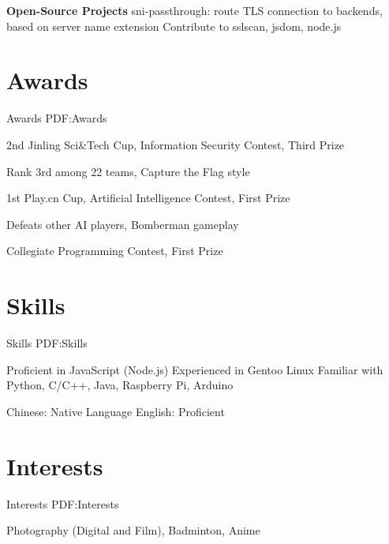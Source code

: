 \documentclass[a4paper,MMMyyyy,nonstop]{simpleresumecv}
\begin{document}
\begin{body}


\GapNoBreak

\textbf{Open-Source Projects}
\BulletItem
sni-passthrough: route TLS connection to backends, based on server name extension
\BulletItem
Contribute to sslscan, jsdom, node.js


\section
{Awards}
{Awards}
{PDF:Awards}

\BulletItem
2nd Jinling Sci\&Tech Cup, Information Security Contest, Third Prize
\hfill
\textbf{  }
\begin{detail}
\SubItem
Rank 3rd among 22 teams, Capture the Flag style
\end{detail}

\BulletItem
1st Play.cn Cup, Artificial Intelligence Contest, First Prize
\hfill
\textbf{  }
\begin{detail}
\SubItem
Defeats other AI players, Bomberman gameplay
\end{detail}

\BulletItem
Collegiate Programming Contest, First Prize
\hfill
\textbf{  }


\section
{Skills}
{Skills}
{PDF:Skills}

\BulletItem
Proficient in JavaScript (Node.js)
\BulletItem
Experienced in Gentoo Linux
\BulletItem
Familiar with Python, C/C++, Java, Raspberry Pi, Arduino

\BulletItem
Chinese: Native Language
\BulletItem
English: Proficient


\section
{Interests}
{Interests}
{PDF:Interests}

Photography (Digital and Film), Badminton, Anime

\end{body}
\end{document}

